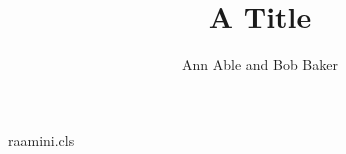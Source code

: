 \begin{filecontents*}[overwrite]{raamini.cls}
\newdimen\instindent
\def\institute#1{\gdef\@institute{#1}}
\def\RAAabstract#1{\gdef\@abstract{#1}}
\AtEndOfClass{\let\abstract=\RAAabstract}
\def\keywordname{{\bfseries Key words:~}}
\def\keywords{\par\addvspace\baselineskip\noindent\keywordname\ \ignorespaces}
\def\inst#1{\unskip$^{#1}$}
\def\institutename{\par
 \begin{flushleft}
 \begingroup
 \parindent=0pt
 \parskip=0pt
 \setcounter{inst}{1}%
 \def\and{\par\stepcounter{inst}%
 \hangindent\instindent
 \noindent
 \hbox to\instindent{\hss$^{\theinst}$\enspace}\ignorespaces}%
 \setbox0=\vbox{\def\thanks##1{}\@institute}
 \ifnum\value{inst}>9\relax\setbox0=\hbox{$^{88}$\enspace}%
                 \else\setbox0=\hbox{$^{8}$\enspace}\fi
 \instindent=\wd0\relax
 \ifnum\value{inst}=1\relax
 \else
   \parindent=0pt
   \setcounter{inst}{1}%
   \hangindent\instindent
   \noindent
   \hbox to\instindent{\hss$^{\theinst}$\enspace}\ignorespaces
 \fi
 \normalsize
 \ignorespaces
 \@institute\par
 \end{flushleft}
 \endgroup}
\def\maketitle{\par\begingroup\@maketitle\endgroup}
\def\@maketitle{\begin{flushleft}{\Large\bfseries\noindent\ignorespaces\@title\par}\vskip14pt
 {\large\noindent\ignorespaces\@author}\end{flushleft}
 \vskip6pt\leftskip=1cm\rightskip=\leftskip
 \institutename
 \vskip12pt\noindent{\bfseries\abstractname}\ \@abstract\par}
\end{filecontents*}
\documentclass{raamini}

\title{A Title}
\author{Ann Able and Bob Baker}
\maketitle
\section{Intro}
Text.

